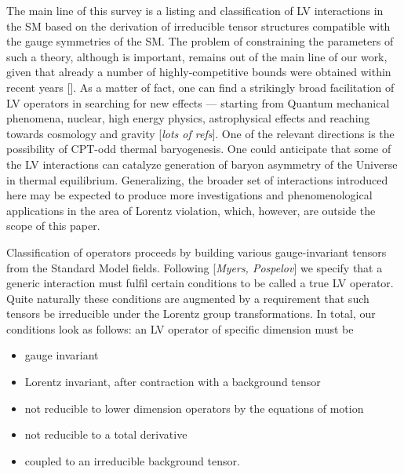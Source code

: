 \documentclass[12pt]{revtex4}
\begin{document}
	The main line of this survey is a listing and
	classification of LV interactions in the SM based on the derivation of irreducible
	tensor structures compatible with the gauge symmetries of the SM.
	The problem of constraining the parameters of such a theory, although
	is important, remains out of the main line of our work, given
	that already a number of highly-competitive bounds were obtained
	within recent years [].
	As a matter of fact,
	one can find a strikingly broad 
	facilitation of LV operators in searching for new effects ---
	starting from Quantum mechanical phenomena, nuclear, high energy physics,
	astrophysical effects and reaching towards cosmology and gravity
	[{\it lots of refs}].
	One of the relevant directions is the possibility of CPT-odd
	thermal baryogenesis.
	One could anticipate that some of the LV interactions can catalyze 
	generation of baryon asymmetry of the Universe in thermal equilibrium.
	Generalizing, the broader set of interactions introduced here may be expected to 
	produce more investigations and phenomenological applications in the area of
	Lorentz violation, which, however, are outside the scope of this paper. 

	Classification of operators proceeds by building various gauge-invariant tensors
	from the Standard Model fields. 
	Following [{\it Myers, Pospelov}] we specify that a generic interaction must
	fulfil certain conditions to be called a true LV operator. 
	Quite naturally these conditions are augmented by a requirement that such
	tensors be irreducible under the Lorentz group transformations.
	In total, our conditions look as follows: 
	an LV operator of specific dimension must be
\begin{itemize}
	\item gauge invariant
	\item Lorentz invariant, after contraction with a background tensor
	\item not reducible to lower dimension operators by the equations
		of motion
	\item not reducible to a total derivative
	\item coupled to an irreducible background tensor.
\end{itemize}
\end{document}
